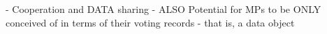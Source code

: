 - Cooperation and DATA sharing
- ALSO Potential for MPs to be ONLY conceived of in terms of their voting records - that is, a  data object
